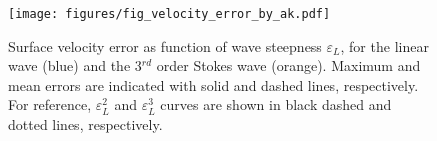 \documentclass[lineno]{jfm}
\begin{document}
\begin{figure}
\centering
\texttt{[image: figures/fig\_velocity\_error\_by\_ak.pdf]}
\caption{
  Surface velocity error as function of wave steepness $\varepsilon_L$,
  for the linear wave (blue) and the 3$^{rd}$ order Stokes wave (orange).
  Maximum and mean errors are indicated with solid and dashed lines,
  respectively.
  For reference, $\varepsilon_L^2$ and $\varepsilon_L^3$ curves are shown in
  black dashed and dotted lines, respectively.
}
\label{fig:velocity_error_by_ak}
\end{figure}



\end{document}
